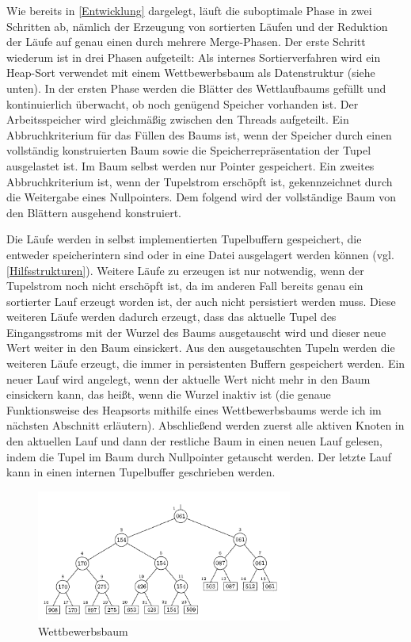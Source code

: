 \documentclass[a4paper,12pt,twoside]{article}
\begin{document}
{Wie bereits in \autoref{Entwicklung} dargelegt, läuft die suboptimale Phase in zwei Schritten ab, nämlich der Erzeugung von sortierten Läufen und der Reduktion der Läufe auf genau einen durch mehrere Merge-Phasen. Der erste Schritt wiederum ist in drei Phasen aufgeteilt: Als internes Sortierverfahren wird ein Heap-Sort verwendet mit einem Wettbewerbsbaum als Datenstruktur (siehe unten). In der ersten Phase werden die Blätter des Wettlaufbaums gefüllt und kontinuierlich überwacht, ob noch genügend Speicher vorhanden ist. Der Arbeitsspeicher wird gleichmäßig zwischen den Threads aufgeteilt. Ein Abbruchkriterium für das Füllen des Baums ist, wenn der Speicher durch einen vollständig konstruierten Baum sowie die Speicherrepräsentation der Tupel ausgelastet ist. Im Baum selbst werden nur Pointer gespeichert. Ein zweites Abbruchkriterium ist, wenn der Tupelstrom erschöpft ist, gekennzeichnet durch die Weitergabe eines Nullpointers. Dem folgend wird der vollständige Baum von den Blättern ausgehend konstruiert.

Die Läufe werden in selbst implementierten Tupelbuffern gespeichert, die entweder speicherintern sind oder in eine Datei ausgelagert werden können (vgl. \autoref{Hilfsstrukturen}). Weitere Läufe zu erzeugen ist nur notwendig, wenn der Tupelstrom noch nicht erschöpft ist, da im anderen Fall bereits genau ein sortierter Lauf erzeugt worden ist, der auch nicht persistiert werden muss. Diese weiteren Läufe werden dadurch erzeugt, dass das aktuelle Tupel des Eingangsstroms mit der Wurzel des Baums ausgetauscht wird und dieser neue Wert weiter in den Baum einsickert. Aus den ausgetauschten Tupeln werden die weiteren Läufe erzeugt, die immer in persistenten Buffern gespeichert werden. Ein neuer Lauf wird angelegt, wenn der aktuelle Wert nicht mehr in den Baum einsickern kann, das heißt, wenn die Wurzel inaktiv ist (die genaue Funktionsweise des Heapsorts mithilfe eines Wettbewerbsbaums werde ich im nächsten Abschnitt erläutern). Abschließend werden zuerst alle aktiven Knoten in den aktuellen Lauf und dann der restliche Baum in einen neuen Lauf gelesen, indem die Tupel im Baum durch Nullpointer getauscht werden. Der letzte Lauf kann in einen internen Tupelbuffer geschrieben werden.

\begin{figure}
	\centering
	\includegraphics[width=0.75\textwidth]{Bilder/tournament.png}
	\caption{Wettbewerbsbaum \parencite[S. 253]{Knuth1973}}
	\label{img:tournament}
\end{figure}

}
\end{document}
